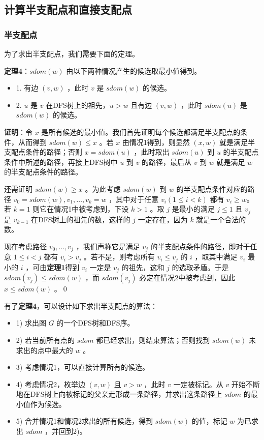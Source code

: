 \documentclass{noithesis}
\begin{document}
\subsection{计算半支配点和直接支配点}

\subsubsection{半支配点}

为了求出半支配点，我们需要下面的定理。

\textbf{定理4}：$sdom(w)$ 由以下两种情况产生的候选取最小值得到。

\begin{itemize}
	\item 1. 有边 $(v,w)$ ，此时 $v$ 是 $sdom(w)$ 的候选。
	\item 2. $u$ 是 $v$ 在DFS树上的祖先，$u > w$ 且有边 $(v,w)$ ，此时 $sdom(u)$ 是 $sdom(w)$ 的候选。
\end{itemize}

\textbf{证明}：令 $x$ 是所有候选的最小值。我们首先证明每个候选都满足半支配点的条件，从而得到 $sdom(w)\le x$ 。若 $x$ 由情况1得到，则显然 $(x,w)$ 就是满足半支配点条件的路径；否则 $x = sdom(u)$ ，此时取出 $sdom(u)$ 到 $u$ 的半支配点条件中所述的路径，再接上DFS树中 $u$ 到 $v$ 的路径，最后从 $v$ 到 $w$ 就是满足 $w$ 的半支配点条件的路径。

还需证明 $sdom(w)\ge x$ 。为此考虑 $sdom(w)$ 到 $w$ 的半支配点条件对应的路径 $v_0=sdom(w), v_1, \dots, v_k = w$ ，其中对于任意 $v_i(1\le i<k)$ 都有 $v_i\ge w$。若 $k=1$ 则它在情况1中被考虑到，下设 $k > 1$ 。取 $j$ 是最小的满足 $j\le 1$ 且 $v_j$ 是 $v_{k-1}$ 在DFS树上的祖先的数，这样的 $j$ 一定存在，因为 $k$ 就是一个合法的数。

现在考虑路径 $v_0,\dots,v_j$ ，我们声称它是满足 $v_j$ 的半支配点条件的路径，即对于任意 $1\le i<j$ 都有 $v_i > v_j$ 。若不是，则考虑所有 $v_i\le v_j$ 的 $i$ ，取其中满足 $v_i$ 最小的 $i$ ，可由\textbf{定理1}得到 $v_i$ 一定是 $v_j$ 的祖先，这和 $j$ 的选取矛盾。于是 $sdom(v_j)\le sdom(w)$ ，而 $sdom(v_j)$ 必定在情况2中被考虑到，因此 $x\le sdom(w)$ 。\qed

有了\textbf{定理4}，可以设计如下求出半支配点的算法：

\begin{itemize}
	\item 1) 求出图 $G$ 的一个DFS树和DFS序。
	\item 2) 若当前所有点的 $sdom$ 都已经求出，则结束算法；否则找到 $sdom(w)$ 未求出的点中最大的 $w$ 。
	\item 3) 考虑情况1，可以直接计算所有的候选。
	\item 4) 考虑情况2，枚举边 $(v,w)$ 且 $v > w$ ，此时 $v$ 一定被标记。从 $v$ 开始不断地在DFS树上向被标记的父亲走形成一条路径，并求出这条路径上 $sdom$ 的最小值作为候选。
	\item 5) 合并情况1和情况2求出的所有候选，得到 $sdom(w)$ 的值，标记 $w$ 为已求出 $sdom$ ，并回到2)。
\end{itemize}
\end{document}
